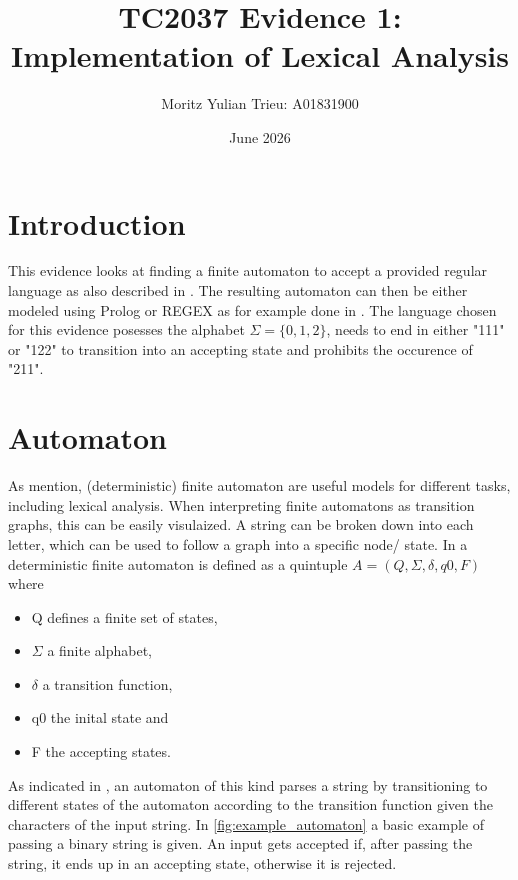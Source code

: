 \documentclass{article}
\title{TC2037 Evidence 1: Implementation of Lexical Analysis}
\author{Moritz Yulian Trieu: A01831900}
\date{June 2026}
\begin{document}
\maketitle
\section{Introduction} \label{sec:intro}
This evidence looks at finding a finite automaton to accept a provided regular language as also described in \cite{stakano_formal_languages}. 
The resulting automaton can then be either modeled using Prolog or REGEX as for example done in \cite{g4g-desfiniteautomaton}.
The language chosen for this evidence posesses the alphabet $\Sigma = \{0, 1, 2\}$, needs to end in either "111" or "122" to 
transition into an accepting state and prohibits the occurence of "211".
\section{Automaton} 
As \cite{hopcroft2001introduction} mention, (deterministic) finite automaton are useful models for different tasks, including lexical analysis.
When interpreting finite automatons as transition graphs, this can be easily visulaized.
A string can be broken down into each letter, which can be used to follow a graph into a specific node/ state.
In \cite{hopcroft2001introduction} a deterministic finite automaton is defined as a
quintuple $A= (Q, \Sigma, \delta, q0, F)$ where
\begin{itemize}
    \item Q defines a finite set of states,
    \item $\Sigma$ a finite alphabet,
    \item $\delta$ a transition function,
    \item q0 the inital state and
    \item F the accepting states.
\end{itemize}
As indicated in \cite{stakano_formal_languages}, an automaton of this kind parses a string by transitioning to different states of the automaton 
according to the transition function given the characters of the input string. In \cref{fig:example_automaton} a basic example of passing a binary string is given.
An input gets accepted if, after passing the string, it ends up in an accepting
state, otherwise it is rejected.
\end{document}
